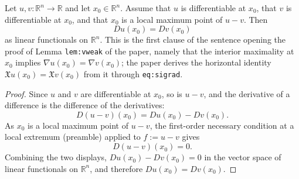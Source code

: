 \begin{lemma}
Let $u,v:\mathbb{R}^n\to\mathbb{R}$ and let $x_0\in\mathbb{R}^n$. Assume that $u$ is differentiable
at $x_0$, that $v$ is differentiable at $x_0$, and that $x_0$ is a local maximum point of $u-v$.
Then
$$Du(x_0)=Dv(x_0)$$
as linear functionals on $\mathbb{R}^n$. This is the first clause of the sentence opening the proof
of Lemma \texttt{lem:vweak} of the paper, namely that the interior maximality at $x_0$ implies
$\nabla u(x_0)=\nabla v(x_0)$; the paper derives the horizontal identity
$\mathfrak{X}u(x_0)=\mathfrak{X}v(x_0)$ from it through \texttt{eq:sigrad}.
\end{lemma}
\begin{proof}
Since $u$ and $v$ are differentiable at $x_0$, so is $u-v$, and the derivative of a difference is
the difference of the derivatives:
$$D(u-v)(x_0)=Du(x_0)-Dv(x_0).$$
As $x_0$ is a local maximum point of $u-v$, the first-order necessary condition at a local extremum
(preamble) applied to $f:=u-v$ gives
$$D(u-v)(x_0)=0.$$
Combining the two displays, $Du(x_0)-Dv(x_0)=0$ in the vector space of linear functionals on
$\mathbb{R}^n$, and therefore $Du(x_0)=Dv(x_0)$.
\end{proof}
